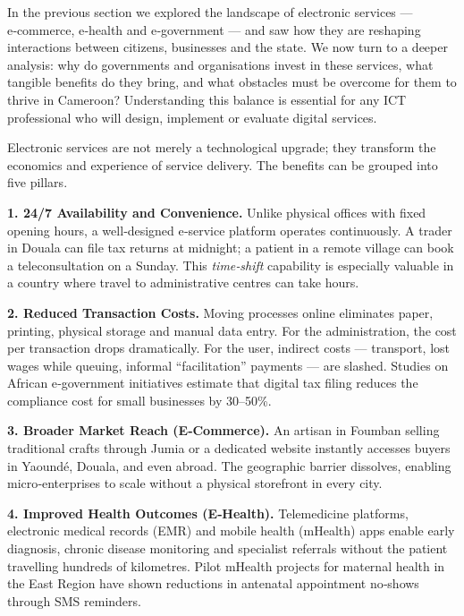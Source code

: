 \documentclass[11pt]{article}
\newcounter{popsec}
\newcounter{popsub}
\newcommand{\courssub}[1]{%
  \stepcounter{popsub}%
  \par\vspace{9pt}\noindent{\popxbold\fontsize{11.5}{13}\selectfont\color{popink}{\color{poporange}\thepopsec.\thepopsub}\hspace{6pt}#1}\par\nopagebreak\vspace{4pt}
}
\begin{document}
In the previous section we explored the landscape of electronic services — e‑commerce, e‑health and e‑government — and saw how they are reshaping interactions between citizens, businesses and the state. We now turn to a deeper analysis: why do governments and organisations invest in these services, what tangible benefits do they bring, and what obstacles must be overcome for them to thrive in Cameroon? Understanding this balance is essential for any ICT professional who will design, implement or evaluate digital services.

\courssub{Key Benefits of Electronic Services}

Electronic services are not merely a technological upgrade; they transform the economics and experience of service delivery. The benefits can be grouped into five pillars.

\textbf{1. 24/7 Availability and Convenience.} Unlike physical offices with fixed opening hours, a well‑designed e‑service platform operates continuously. A trader in Douala can file tax returns at midnight; a patient in a remote village can book a teleconsultation on a Sunday. This \emph{time‑shift} capability is especially valuable in a country where travel to administrative centres can take hours.

\textbf{2. Reduced Transaction Costs.} Moving processes online eliminates paper, printing, physical storage and manual data entry. For the administration, the cost per transaction drops dramatically. For the user, indirect costs — transport, lost wages while queuing, informal “facilitation” payments — are slashed. Studies on African e‑government initiatives estimate that digital tax filing reduces the compliance cost for small businesses by 30–50\%.

\textbf{3. Broader Market Reach (E‑Commerce).} An artisan in Foumban selling traditional crafts through Jumia or a dedicated website instantly accesses buyers in Yaoundé, Douala, and even abroad. The geographic barrier dissolves, enabling micro‑enterprises to scale without a physical storefront in every city.

\textbf{4. Improved Health Outcomes (E‑Health).} Telemedicine platforms, electronic medical records (EMR) and mobile health (mHealth) apps enable early diagnosis, chronic disease monitoring and specialist referrals without the patient travelling hundreds of kilometres. Pilot mHealth projects for maternal health in the East Region have shown reductions in antenatal appointment no‑shows through SMS reminders.
\end{document}
